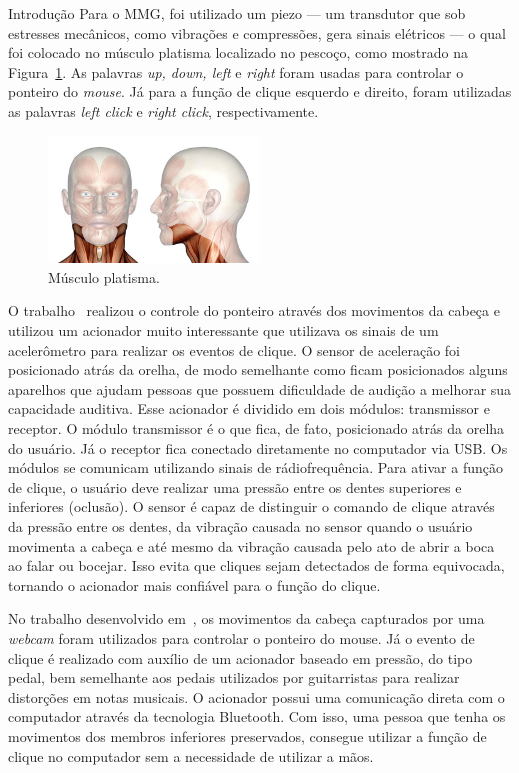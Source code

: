 \begin{chapter}{Introdução}
Para o MMG, foi utilizado um piezo --- um transdutor que sob estresses
mecânicos, como vibrações e compressões, gera sinais elétricos --- o qual foi
colocado no músculo platisma localizado no pescoço, como mostrado na
Figura~\ref{fig:platisma}. As palavras \textit{up, down, left} e \textit{right}
foram usadas para controlar o ponteiro do \textit{mouse}. Já para a função de
clique esquerdo e direito, foram utilizadas as palavras \textit{left click} e
\textit{right click}, respectivamente.
\begin{figure}[!h]
	\centering
	\includegraphics[width=0.5\textwidth]{fig/platisma}
	\caption{Músculo platisma.}
	\label{fig:platisma}
\end{figure}

O trabalho~\cite{Simpson08} realizou o controle do ponteiro através dos
movimentos da cabeça e utilizou um acionador muito interessante que
utilizava os sinais de um acelerômetro para realizar os eventos de clique. O
sensor de aceleração foi posicionado atrás da orelha, de modo semelhante como
ficam posicionados alguns aparelhos que ajudam pessoas que possuem
dificuldade de audição a melhorar sua capacidade auditiva. Esse acionador é
dividido em dois módulos: transmissor e receptor. O módulo transmissor é o que
fica, de fato, posicionado atrás da orelha do usuário. Já o receptor fica
conectado diretamente no computador via USB. Os módulos se comunicam utilizando
sinais de rádiofrequência. Para ativar a função de clique, o usuário deve
realizar uma pressão entre os dentes superiores e inferiores (oclusão).  O
sensor é capaz de distinguir o comando de clique através da pressão entre os
dentes, da vibração causada no sensor quando o usuário movimenta a cabeça e até
mesmo da vibração causada pelo ato de abrir a boca ao falar ou bocejar. Isso
evita que cliques sejam detectados de forma equivocada, tornando o acionador
mais confiável para o função do clique.

No trabalho desenvolvido em~\cite{Antunes16}, os movimentos da cabeça capturados
por uma \textit{webcam} foram utilizados para controlar o ponteiro do mouse. Já
o evento de clique é realizado com auxílio de um acionador baseado em pressão,
do tipo pedal, bem semelhante aos pedais utilizados por guitarristas para
realizar distorções em notas musicais. O acionador possui uma comunicação direta
com o computador através da tecnologia Bluetooth. Com isso, uma pessoa que tenha
os movimentos dos membros inferiores preservados, consegue utilizar a função de
clique no computador sem a necessidade de utilizar a mãos. 


\end{chapter}
